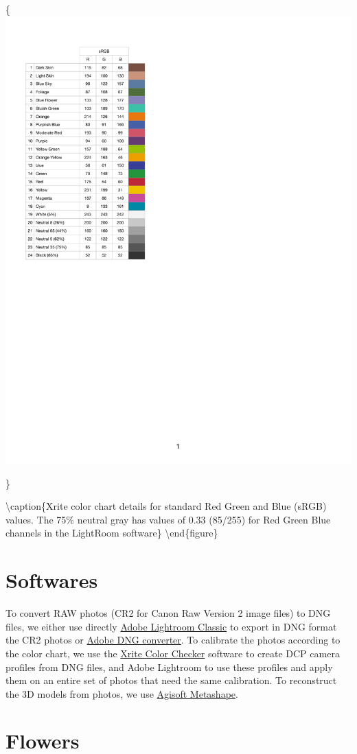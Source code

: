 \documentclass[
]{book}
\begin{document}
\{\centering \includegraphics[width=0.5\linewidth]{Figures/Color_chart_sRGB_values}

\}

\textbackslash caption\{Xrite color chart details for standard Red Green and Blue (sRGB) values. The 75\% neutral gray has values of 0.33 (85/255) for Red Green Blue channels in the LightRoom software\}\label{fig:xrite}
\textbackslash end\{figure\}

\hypertarget{softwares}{%
\section{Softwares}\label{softwares}}

To convert RAW photos (CR2 for Canon Raw Version 2 image files) to DNG
files, we either use directly \href{https://www.adobe.com/ca_fr/products/photoshop-lightroom-classic.html}{Adobe Lightroom
Classic}
to export in DNG format the CR2 photos or \href{https://helpx.adobe.com/camera-raw/using/adobe-dng-converter.html}{Adobe DNG
converter}.
To calibrate the photos according to the color chart, we use the \href{https://xritephoto.com/ph_product_overview.aspx?ID=938\&Action=Support\&SoftwareID=2030}{Xrite
Color
Checker}
software to create DCP camera profiles from DNG files, and Adobe
Lightroom to use these profiles and apply them on an entire set of
photos that need the same calibration. To reconstruct the 3D models from
photos, we use \href{https://www.agisoft.com/downloads/installer/}{Agisoft
Metashape}.

\hypertarget{flowers}{%
\section{Flowers}\label{flowers}}
\end{document}
